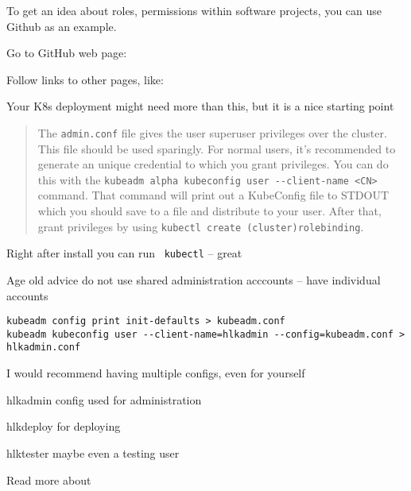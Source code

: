 \documentclass[Screen16to9,17pt]{foils}
\begin{document}

To get an idea about roles, permissions within software projects, you can use Github as an example.

\begin{list2}
\item
Go to GitHub web page:\\
\item Follow links to other pages, like:\\
\item Your K8s deployment might need more than this, but it is a nice starting point
\end{list2}




\begin{quote}
The \verb+admin.conf+ file gives the user superuser privileges over the cluster. This file should be used sparingly. For normal users, it's recommended to generate an unique credential to which you grant privileges. You can do this with the \verb+kubeadm alpha kubeconfig user --client-name <CN>+ command. That command will print out a KubeConfig file to STDOUT which you should save to a file and distribute to your user. After that, grant privileges by using \verb+kubectl create (cluster)rolebinding+.
\end{quote}

\begin{list2}
\item Right after install you can run \faWrench\ \verb+kubectl+ -- great
\item Age old advice do not use shared administration acccounts -- have individual accounts
\end{list2}



\begin{verbatim}
kubeadm config print init-defaults > kubeadm.conf
kubeadm kubeconfig user --client-name=hlkadmin --config=kubeadm.conf > hlkadmin.conf
\end{verbatim}

\begin{list2}
\item I would recommend having multiple configs, even for yourself
\item hlkadmin config used for administration
\item hlkdeploy for deploying
\item hlktester maybe even a testing user
\item Read more about 
\end{list2}
\end{document}
